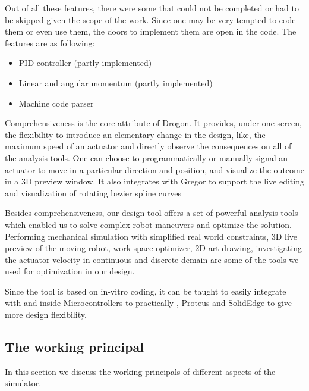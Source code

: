 {    Out of all these features, there were some that could not be completed or had to be skipped given the scope of the work. Since one may be very tempted to code them or even use them, the doors to implement them are open in the code. The features are as following:
    \begin{itemize}
      \item PID controller (partly implemented)
      \item Linear and angular momentum (partly implemented)
      \item Machine code parser
    \end{itemize}

    Comprehensiveness is the core attribute of Drogon. It provides, under one screen, the flexibility to introduce an elementary change in the design, like, the maximum speed of an actuator and directly observe the consequences on all of the analysis tools. One can choose to programmatically or manually signal an actuator to move in a particular direction and position, and visualize the outcome in a $3$D preview window. It also integrates with Gregor to support the live editing and visualization of rotating bezier spline curves

    Besides comprehensiveness, our design tool offers a set of powerful analysis tools which enabled us to solve complex robot maneuvers and optimize the solution. Performing mechanical simulation with simplified real world constraints, $3$D live preview of the moving robot, work-space optimizer, $2$D art drawing, investigating the actuator velocity in continuous and discrete demain are some of the tools we used for optimization in our design.

    Since the tool is based on in-vitro coding, it can be taught to easily integrate with and inside Microcontrollers to practically , Proteus and SolidEdge to give more design flexibility.

    \subsection{The working principal}
    In this section we discuss the working principals of different aspects of the simulator.

}
